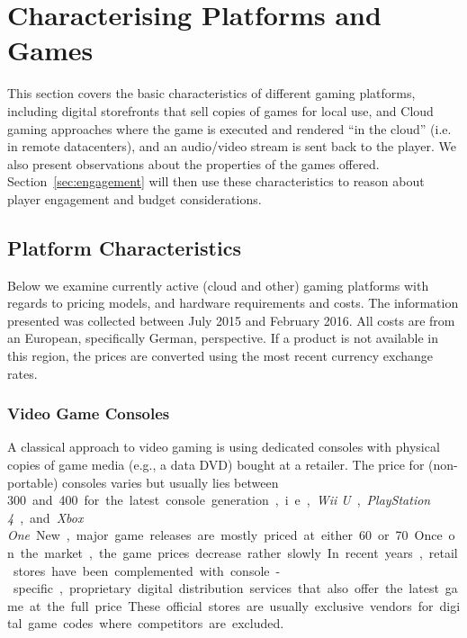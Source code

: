 \section{Characterising Platforms and Games}
\label{sec:background}

This section covers the basic characteristics of different gaming platforms, including digital storefronts that sell copies of games for local use, and Cloud gaming approaches where the game is executed and rendered ``in the cloud'' (i.e. in remote datacenters), and an audio/video stream is sent back to the player. We also present observations about the properties of the games offered.
Section~\ref{sec:engagement} will then use these characteristics to reason about player engagement and budget considerations.

\subsection{Platform Characteristics}

Below we examine currently active (cloud and other) gaming platforms with regards to pricing models, and hardware requirements and costs. The information presented was collected between July 2015 and February 2016. All costs are from an European, specifically German, perspective. If a product is not available in this region, the prices are converted using the most recent currency exchange rates.


\subsubsection{Video Game Consoles}

A classical approach to video gaming is using dedicated consoles with physical copies of game media (e.g., a data DVD) bought at a retailer. The price for (non-portable) consoles varies but usually lies between \SI{300}[\EUR] and \SI{400}[\EUR] for the latest console generation, i.e., \textit{Wii U}, \textit{PlayStation 4}, and \textit{Xbox One}. New, major game releases are mostly priced at either \SI{60}[\EUR] or \SI{70}[\EUR]. Once on the market, the game prices decrease rather slowly. In recent years, retail stores have been complemented with console-specific, proprietary digital distribution services that also offer the latest game at the full price. These official stores are usually exclusive vendors for digital game codes where competitors are excluded.

